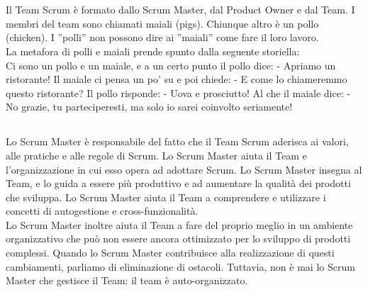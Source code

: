 \section*{\color{Blue}{I RUOLI IN SCRUM}}
\label{sec:roles}
Il Team Scrum \`e formato dallo Scrum Master, dal Product Owner e dal Team. I membri del team sono chiamati maiali
(pigs). Chiunque altro è un pollo (chicken). I ''polli'' non possono dire ai ''maiali'' come fare il loro lavoro.\\ La
metafora di polli e maiali prende spunto dalla seguente storiella: \\ Ci sono un pollo e un maiale, e a un certo punto
il pollo dice: - Apriamo un ristorante! Il maiale ci pensa un po' su e poi chiede: - E come lo chiameremmo questo
ristorante? Il pollo risponde: - Uova e prosciutto! Al che il maiale dice: - No grazie, tu parteciperesti, ma solo io
sarei coinvolto seriamente!


\subsection*{\color{Blue}{LO SCRUM MASTER}}
\label{sec:scrummaster}
Lo Scrum Master \`e responsabile del fatto che il Team Scrum aderisca ai valori, alle pratiche e alle regole di Scrum.
Lo Scrum Master aiuta il Team e l'organizzazione in cui esso opera ad adottare Scrum. Lo Scrum Master insegna al Team,
e lo guida a essere pi\`u produttivo e ad aumentare la qualit\`a dei prodotti che sviluppa. Lo Scrum Master aiuta il
Team a comprendere e utilizzare i concetti di autogestione e cross-funzionalit\`a.\\ Lo Scrum Master inoltre aiuta il
Team a fare del proprio meglio in un ambiente organizzativo che pu\`o non essere ancora ottimizzato per lo sviluppo di
prodotti complessi. Quando lo Scrum Master contribuisce alla realizzazione di questi cambiamenti, parliamo di
eliminazione di ostacoli. Tuttavia, non \`e mai lo Scrum Master che gestisce il Team: il team \`e auto-organizzato.



